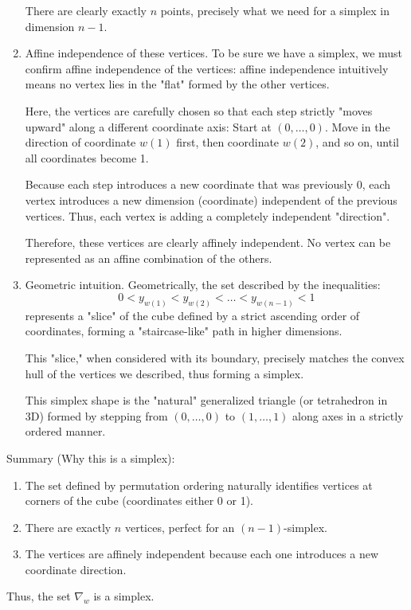 \documentclass[12pt]{article}
\theoremstyle{definition}
\numberwithin{equation}{subsection}
\begin{document}
\begin{enumerate}
There are clearly exactly $n$ points, precisely what we need for a simplex in dimension $n-1$.
    \item Affine independence of these vertices. To be sure we have a simplex, we must confirm affine independence of the vertices: affine independence intuitively means no vertex lies in the "flat" formed by the other vertices.

Here, the vertices are carefully chosen so that each step strictly "moves upward" along a different coordinate axis: Start at $(0,\dots,0)$.
Move in the direction of coordinate $w(1)$ first, then coordinate $w(2)$, and so on, until all coordinates become 1.

Because each step introduces a new coordinate that was previously 0, each vertex introduces a new dimension (coordinate) independent of the previous vertices. Thus, each vertex is adding a completely independent "direction".

Therefore, these vertices are clearly affinely independent. No vertex can be represented as an affine combination of the others.
    \item Geometric intuition. Geometrically, the set described by the inequalities:
  $$
  0 < y_{w(1)} < y_{w(2)} < \dots < y_{w(n-1)} < 1
  $$
represents a "slice" of the cube defined by a strict ascending order of coordinates, forming a "staircase-like" path in higher dimensions.

This "slice," when considered with its boundary, precisely matches the convex hull of the vertices we described, thus forming a simplex.

This simplex shape is the "natural" generalized triangle (or tetrahedron in 3D) formed by stepping from $(0,\dots,0)$ to $(1,\dots,1)$ along axes in a strictly ordered manner.

\end{enumerate}

Summary (Why this is a simplex):
\begin{enumerate}
    \item The set defined by permutation ordering naturally identifies vertices at corners of the cube (coordinates either 0 or 1).
    \item There are exactly $n$ vertices, perfect for an $(n-1)$-simplex.
    \item The vertices are affinely independent because each one introduces a new coordinate direction.
\end{enumerate}
Thus, the set $\nabla_w$ is a simplex.
\end{document}
